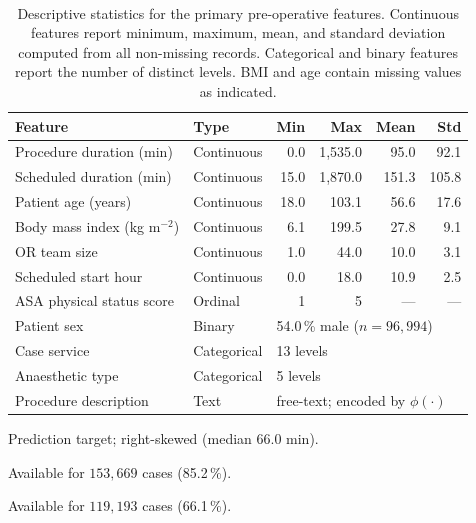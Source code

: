 \begin{table}[tp]
\centering
\caption{\\Descriptive statistics for the primary pre-operative features. Continuous features report minimum, maximum, mean, and standard deviation computed from all non-missing records. Categorical and binary features report the number of distinct levels. BMI and age contain missing values as indicated.}
\label{tab:dataset_desc}
\begin{threeparttable}
\begin{tabular}{llrrrr}
\toprule
Feature & Type & Min & Max & Mean & Std \\
\midrule
Procedure duration (min)\tnote{a} & Continuous & 0.0 & 1{,}535.0 & 95.0 & 92.1 \\
Scheduled duration (min) & Continuous & 15.0 & 1{,}870.0 & 151.3 & 105.8 \\
Patient age (years)\tnote{b} & Continuous & 18.0 & 103.1 & 56.6 & 17.6 \\
Body mass index (kg m$^{-2}$)\tnote{c} & Continuous & 6.1 & 199.5 & 27.8 & 9.1 \\
OR team size & Continuous & 1.0 & 44.0 & 10.0 & 3.1 \\
Scheduled start hour & Continuous & 0.0 & 18.0 & 10.9 & 2.5 \\
ASA physical status score & Ordinal & 1 & 5 & — & — \\
Patient sex & Binary & \multicolumn{4}{l}{54.0\,\% male ($n = 96{,}994$)} \\
Case service & Categorical & \multicolumn{4}{l}{13 levels} \\
Anaesthetic type & Categorical & \multicolumn{4}{l}{5 levels} \\
Procedure description & Text & \multicolumn{4}{l}{free-text; encoded by $\phi(\cdot)$} \\
\bottomrule
\end{tabular}
\begin{tablenotes}
\small
\item[a] Prediction target; right-skewed (median $66.0$ min).
\item[b] Available for $153{,}669$ cases (85.2\,\%).
\item[c] Available for $119{,}193$ cases (66.1\,\%).
\end{tablenotes}
\end{threeparttable}
\end{table}

